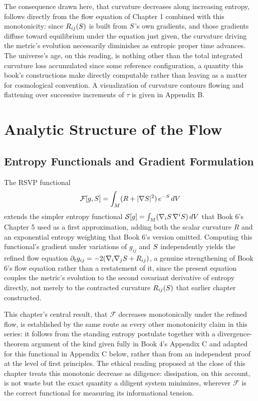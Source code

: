 The consequence drawn here, that curvature decreases along increasing entropy, follows directly from the flow equation of Chapter 1 combined with this monotonicity: since $R_{ij}(S)$ is built from $S$'s own gradients, and those gradients diffuse toward equilibrium under the equation just given, the curvature driving the metric's evolution necessarily diminishes as entropic proper time advances. The universe's age, on this reading, is nothing other than the total integrated curvature loss accumulated since some reference configuration, a quantity this book's constructions make directly computable rather than leaving as a matter for cosmological convention. A visualization of curvature contours flowing and flattening over successive increments of $\tau$ is given in Appendix B.

\part{Analytic Structure of the Flow}

\chapter{Entropy Functionals and Gradient Formulation}

The RSVP functional
\[
\mathcal{F}[g, S] = \int_M (R + |\nabla S|^2)\, e^{-S}\, dV
\]
extends the simpler entropy functional $\mathcal{S}[g] = \int_M (\nabla_i S \, \nabla^i S)\, dV$ that Book 6's Chapter 5 used as a first approximation, adding both the scalar curvature $R$ and an exponential entropy weighting that Book 6's version omitted. Computing this functional's gradient under variations of $g_{ij}$ and $S$ independently yields the refined flow equation $\partial_t g_{ij} = -2(\nabla_i \nabla_j S + R_{ij})$, a genuine strengthening of Book 6's flow equation rather than a restatement of it, since the present equation couples the metric's evolution to the second covariant derivative of entropy directly, not merely to the contracted curvature $R_{ij}(S)$ that earlier chapter constructed.

This chapter's central result, that $\mathcal{F}$ decreases monotonically under the refined flow, is established by the same route as every other monotonicity claim in this series: it follows from the standing entropy postulate together with a divergence-theorem argument of the kind given fully in Book 4's Appendix C and adapted for this functional in Appendix C below, rather than from an independent proof at the level of first principles. The ethical reading proposed at the close of this chapter treats this monotonic decrease as diligence: dissipation, on this account, is not waste but the exact quantity a diligent system minimizes, wherever $\mathcal{F}$ is the correct functional for measuring its informational tension.

